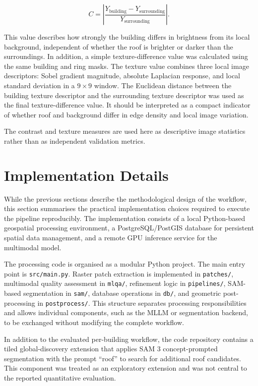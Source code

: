 \begin{equation}
C = \left|
\frac{Y_{\mathrm{building}} - Y_{\mathrm{surrounding}}}
{Y_{\mathrm{surrounding}}}
\right|.
\end{equation}

This value describes how strongly the building differs in brightness from its local background, independent of whether the roof is brighter or darker than the surroundings. In addition, a simple texture-difference value was calculated using the same building and ring masks. The texture value combines three local image descriptors: Sobel gradient magnitude, absolute Laplacian response, and local standard deviation in a \(9 \times 9\) window. The Euclidean distance between the building texture descriptor and the surrounding texture descriptor was used as the final texture-difference value. It should be interpreted as a compact indicator of whether roof and background differ in edge density and local image variation.

The contrast and texture measures are used here as descriptive image statistics rather than as independent validation metrics.

\section{Implementation Details}

While the previous sections describe the methodological design of the workflow, this section summarises the practical implementation choices required to execute the pipeline reproducibly. The implementation consists of a local Python-based geospatial processing environment, a PostgreSQL/PostGIS database for persistent spatial data management, and a remote GPU inference service for the multimodal model.

The processing code is organised as a modular Python project. The main entry point is \texttt{src/main.py}. Raster patch extraction is implemented in \texttt{patches/}, multimodal quality assessment in \texttt{mlqa/}, refinement logic in \texttt{pipelines/}, SAM-based segmentation in \texttt{sam/}, database operations in \texttt{db/}, and geometric post-processing in \texttt{postprocess/}. This structure separates processing responsibilities and allows individual components, such as the MLLM or segmentation backend, to be exchanged without modifying the complete workflow.

In addition to the evaluated per-building workflow, the code repository contains a tiled global-discovery extension that applies SAM 3 concept-prompted segmentation with the prompt ``roof'' to search for additional roof candidates. This component was treated as an exploratory extension and was not central to the reported quantitative evaluation.

